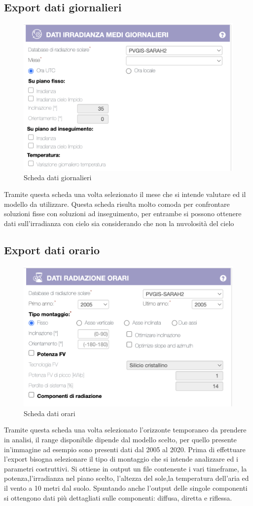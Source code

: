 \subsection{Export dati giornalieri}
\begin{figure}[H]
    \centering
    \includegraphics[height=0.5\textwidth]{res/cap 4/dati giornalieri}
    \caption{Scheda dati giornalieri}
\end{figure}\noindent
Tramite questa scheda una volta selezionato il mese che si intende valutare  ed il modello da utilizzare.
Questa scheda risulta molto comoda per confrontare soluzioni fisse con soluzioni ad inseguimento, per entrambe si possono ottenere dati sull'irradianza con cielo sia considerando che non la nuvolosità del cielo

\subsection{Export dati orario}
\begin{figure}[H]
    \centering
    \includegraphics[height=0.5\textwidth]{res/cap 4/dati orari}
    \caption{Scheda dati orari}
\end{figure}\noindent
Tramite questa scheda una volta selezionato l'orizzonte temporaneo da prendere in analisi, il range disponibile dipende dal modello scelto, per quello presente in'immagine ad esempio sono presenti dati dal 2005 al 2020.
Prima di effettuare l'export bisogna selezionare il tipo di montaggio che si intende analizzare ed i parametri costruttivi.
Si ottiene in output un file contenente i vari timeframe, la potenza,l'irradianza nel piano scelto, l'altezza del sole,la temperatura dell'aria ed il vento a 10 metri dal suolo.
Spuntando anche l'output delle singole componenti si ottengono dati più dettagliati sulle componenti: diffusa, diretta e riflessa.

